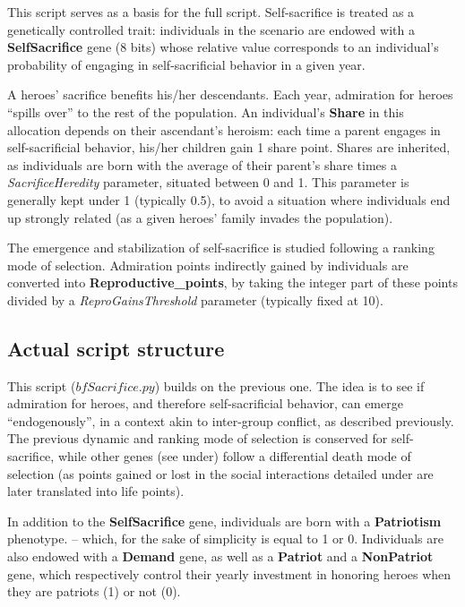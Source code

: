 \documentclass[a4paper,12pt]{report}
\begin{document}
This script serves as a basis for the full script.
Self-sacrifice is treated as a genetically controlled trait:
individuals in the scenario are endowed with a \textbf{SelfSacrifice} gene (8 bits)
whose relative value corresponds to an individual’s probability of
engaging in self-sacrificial behavior in a given year.

A heroes’ sacrifice benefits his/her descendants.
Each year, admiration for heroes “spills over” to the rest of the population.
An individual’s \textbf{Share} in this allocation depends on their ascendant’s heroism:
each time a parent engages in self-sacrificial behavior,
his/her children gain 1 share point.
Shares are inherited, as individuals are born with the average of their parent’s
share times a \emph{SacrificeHeredity} parameter, situated between 0 and 1.
This parameter is generally kept under 1 (typically 0.5), to avoid a situation where
individuals end up strongly related (as a given heroes’ family invades the population).

The emergence and stabilization of self-sacrifice is studied following a
ranking mode of selection.
Admiration points indirectly gained by individuals are converted
into \textbf{Reproductive\_points}, by taking the integer part of these
points divided by a \emph{ReproGainsThreshold} parameter (typically fixed at 10).

\subsection{Actual script structure}
This script ($bf{Sacrifice.py}$) builds on the previous one.
The idea is to see if admiration for heroes, and therefore self-sacrificial behavior,
can emerge “endogenously”, in a context akin to inter-group conflict,
as described previously. The previous dynamic and ranking mode of selection
is conserved for self-sacrifice, while other genes (see under) follow a differential
death mode of selection (as points gained or lost in the social interactions detailed
under are later translated into life points).

In addition to the \textbf{SelfSacrifice} gene, individuals are born with a 
\textbf{Patriotism} phenotype.
– which, for the sake of simplicity is equal to 1 or 0.
Individuals are also endowed with a \textbf{Demand} gene, as well as a \textbf{Patriot}
 and a \textbf{NonPatriot} gene, which respectively control their yearly
 investment in honoring heroes when they are patriots (1) or not (0).
\end{document}
